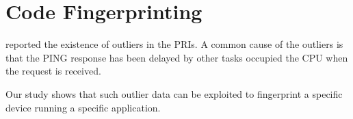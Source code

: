 \section{Code Fingerprinting}
 reported the existence of outliers in the PRIs. A common cause of the outliers is that the PING response has been delayed by other tasks occupied the CPU when the request is received. 

Our study shows that such outlier data can be exploited to fingerprint a specific device running a specific application.